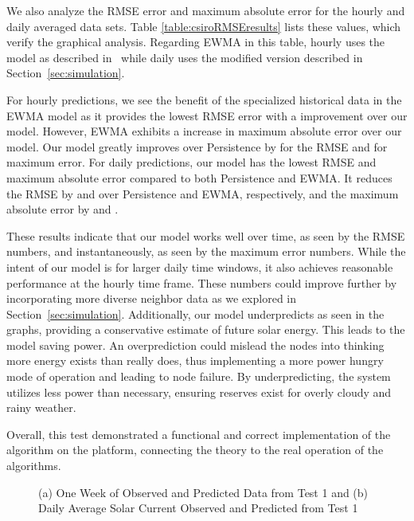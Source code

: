 \documentclass[prodmode,acmtosn]{acmsmall}
\begin{document}
We also analyze the RMSE error and maximum absolute error for the hourly and daily averaged data sets.
Table \ref{table:csiroRMSEresults} lists these values, which verify the graphical analysis.
Regarding EWMA in this table, hourly uses the model as described in~\cite{hsuISPLED2006,kansalDAC2006} while daily uses the modified version described in Section~\ref{sec:simulation}.

For hourly predictions, we see the benefit of the specialized historical data in the EWMA model as it provides the lowest RMSE error with a  improvement over our model.
However, EWMA exhibits a  increase in maximum absolute error over our model. 
Our model greatly improves over Persistence by  for the RMSE and  for maximum error.
For daily predictions, our model has the lowest RMSE and maximum absolute error compared to both Persistence and EWMA.
It reduces the RMSE by  and  over Persistence and EWMA, respectively, and the maximum absolute error by  and .

These results indicate that our model works well over time, as seen by the RMSE numbers, and instantaneously, as seen by the maximum error numbers.
While the intent of our model is for larger daily time windows, it also achieves reasonable performance at the hourly time frame.
These numbers could improve further by incorporating more diverse neighbor data as we explored in Section~\ref{sec:simulation}.
Additionally, our model underpredicts as seen in the graphs, providing a conservative estimate of future solar energy.
This leads to the model saving power.
An overprediction could mislead the nodes into thinking more energy exists than really does, thus implementing a more power hungry mode of operation and leading to node failure.
By underpredicting, the system utilizes less power than necessary, ensuring reserves exist for overly cloudy and rainy weather.

Overall, this test demonstrated a functional and correct implementation of the algorithm on the platform, connecting the theory to the real operation of the algorithms.\newline

\begin{figure*}[htb]
\centering
\caption{(a) One Week of Observed and Predicted Data from Test 1 and (b) Daily Average Solar Current Observed and Predicted from Test 1}
\label{fig:dataResults}
\end{figure*}
\end{document}
